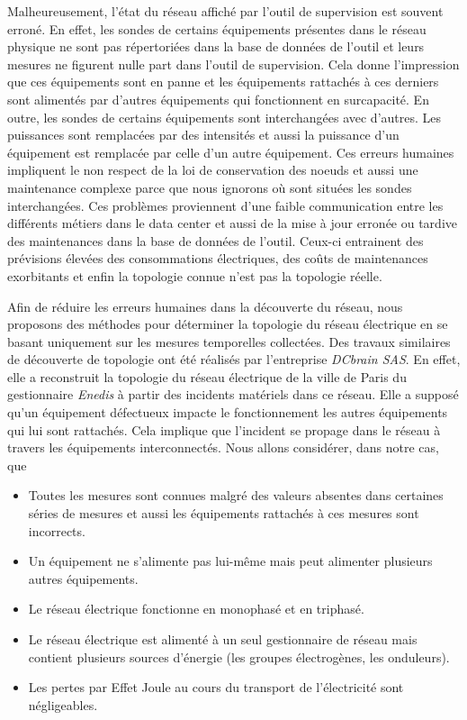 Malheureusement,  l'\'etat du r\'eseau affich\'e par l'outil de supervision est souvent erron\'e. 
En effet,  les sondes de certains \'equipements pr\'esentes dans le r\'eseau physique ne sont pas r\'epertori\'ees dans la base de donn\'ees de l'outil et leurs mesures ne figurent nulle part dans l'outil de supervision. Cela donne l'impression que ces \'equipements sont en panne et  les \'equipements rattach\'es \`a ces derniers sont aliment\'es par d'autres \'equipements qui fonctionnent en surcapacit\'e.  
En outre, les sondes de certains \'equipements sont interchang\'ees avec d'autres. Les puissances sont remplac\'ees par des intensit\'es et aussi la puissance d'un \'equipement est remplac\'ee par celle  d'un autre \'equipement. Ces erreurs humaines impliquent le non respect de la loi de conservation des noeuds et aussi une maintenance complexe  parce que nous ignorons o\`u sont situ\'ees les sondes interchang\'ees.
Ces probl\`emes proviennent d'une faible communication  entre les diff\'erents m\'etiers dans le data center et aussi de la mise \`a jour erron\'ee ou tardive des maintenances dans la base de donn\'ees de l'outil. 
Ceux-ci entrainent  des pr\'evisions \'elev\'ees des consommations \'electriques, des co\^uts de maintenances exorbitants et enfin la topologie connue n'est pas la topologie r\'eelle.
\newline

Afin de r\'eduire les erreurs humaines dans la d\'ecouverte du r\'eseau, nous proposons des m\'ethodes pour d\'eterminer la topologie du r\'eseau \'electrique en se basant uniquement sur les mesures temporelles collect\'ees. 
Des travaux similaires de d\'ecouverte de topologie ont \'et\'e r\'ealis\'es par l'entreprise {\em DCbrain SAS}. En effet, elle a reconstruit la topologie du r\'eseau \'electrique de la ville de Paris du gestionnaire {\em Enedis} \`a partir des incidents mat\'eriels dans ce r\'eseau. Elle a suppos\'e qu'un \'equipement d\'efectueux impacte le fonctionnement les autres \'equipements qui lui sont rattach\'es. Cela implique que l'incident se propage dans le r\'eseau \`a travers les \'equipements interconnect\'es.
\newline
Nous allons consid\'erer, dans notre cas, que 
\begin{itemize}
\item Toutes les mesures sont connues malgr\'e des valeurs absentes dans certaines s\'eries de mesures et aussi les \'equipements rattach\'es \`a ces mesures sont incorrects.
\item Un \'equipement ne s'alimente pas lui-m\^eme mais peut alimenter plusieurs autres \'equipements.
\item Le r\'eseau \'electrique fonctionne en monophas\'e et en triphas\'e. 
\item Le r\'eseau \'electrique est aliment\'e \`a un seul gestionnaire de r\'eseau mais contient plusieurs sources d'\'energie (les groupes \'electrog\`enes, les onduleurs).
\item Les pertes par Effet Joule au cours du transport de l'\'electricit\'e sont n\'egligeables.
\end{itemize}


